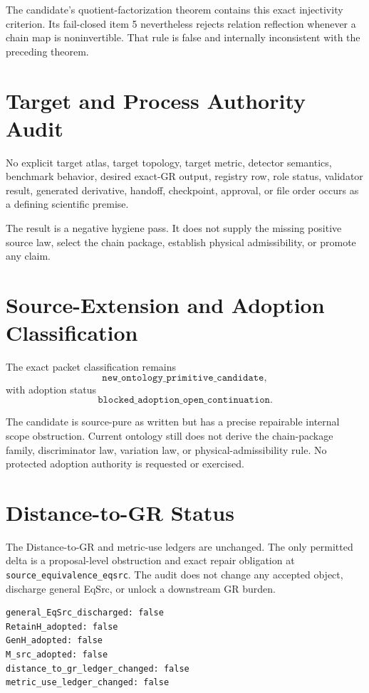 \documentclass[11pt]{article}
\begin{document}
The candidate's quotient-factorization theorem contains this exact
injectivity criterion. Its fail-closed item 5 nevertheless rejects relation
reflection whenever a chain map is noninvertible. That rule is false and
internally inconsistent with the preceding theorem.

\section{Target and Process Authority Audit}

No explicit target atlas, target topology, target metric, detector semantics,
benchmark behavior, desired exact-GR output, registry row, role status,
validator result, generated derivative, handoff, checkpoint, approval, or file
order occurs as a defining scientific premise.

The result is a negative hygiene pass. It does not supply the missing positive
source law, select the chain package, establish physical admissibility, or
promote any claim.

\section{Source-Extension and Adoption Classification}

The exact packet classification remains
\[
\texttt{new\_ontology\_primitive\_candidate},
\]
with adoption status
\[
\texttt{blocked\_adoption\_open\_continuation}.
\]

The candidate is source-pure as written but has a precise repairable internal
scope obstruction. Current ontology still does not derive the chain-package
family, discriminator law, variation law, or physical-admissibility rule.
No protected adoption authority is requested or exercised.

\section{Distance-to-GR Status}

The Distance-to-GR and metric-use ledgers are unchanged. The only permitted
delta is a proposal-level obstruction and exact repair obligation at
\texttt{source\_equivalence\_eqsrc}. The audit does not change any accepted
object, discharge general EqSrc, or unlock a downstream GR burden.

\begin{verbatim}
general_EqSrc_discharged: false
RetainH_adopted: false
GenH_adopted: false
M_src_adopted: false
distance_to_gr_ledger_changed: false
metric_use_ledger_changed: false
\end{verbatim}
\end{document}
